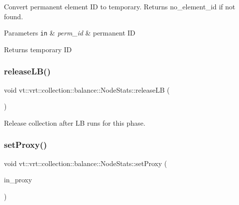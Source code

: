 Convert permanent element ID to temporary. Returns {\ttfamily no\+\_\+element\+\_\+id} if not found. 


\begin{DoxyParams}[1]{Parameters}
\mbox{\tt in}  & {\em perm\+\_\+id} & permanent ID\\
\hline
\end{DoxyParams}
\begin{DoxyReturn}{Returns}
temporary ID 
\end{DoxyReturn}
\mbox{\label{structvt_1_1vrt_1_1collection_1_1balance_1_1_node_stats_a517e67b5ada69873ab40d5f6e007a818}} 
\subsubsection{\texorpdfstring{release\+L\+B()}{releaseLB()}}
{\footnotesize\ttfamily void vt\+::vrt\+::collection\+::balance\+::\+Node\+Stats\+::release\+LB (\begin{DoxyParamCaption}{ }\end{DoxyParamCaption})}



Release collection after LB runs for this phase. 

\mbox{\label{structvt_1_1vrt_1_1collection_1_1balance_1_1_node_stats_a30e9e5def6e7d6d31cd6597c5fea2345}} 
\subsubsection{\texorpdfstring{set\+Proxy()}{setProxy()}}
{\footnotesize\ttfamily void vt\+::vrt\+::collection\+::balance\+::\+Node\+Stats\+::set\+Proxy (\begin{DoxyParamCaption}\item[{\hyperlink{structvt_1_1objgroup_1_1proxy_1_1_proxy}{objgroup\+::proxy\+::\+Proxy}$<$ \hyperlink{structvt_1_1vrt_1_1collection_1_1balance_1_1_node_stats}{Node\+Stats} $>$}]{in\+\_\+proxy }\end{DoxyParamCaption})\hspace{0.3cm}{\ttfamily [private]}}



